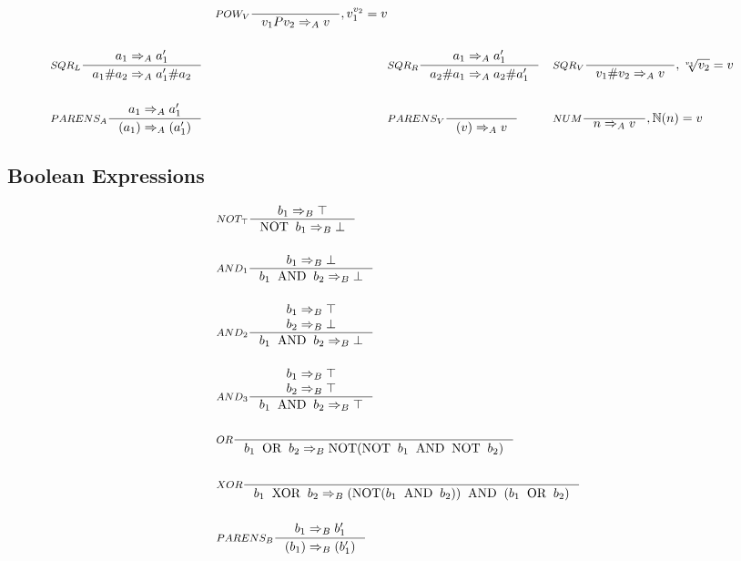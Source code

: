 \begin{align*}
&
&\inference[$POW_V$]{}
                    {v_1 P v_2 \Rightarrow_A v}
										{, v_1 ^ {v_2} = v}
\\\\
&\inference[$SQR_L$]{a_1  \Rightarrow_A a_1'}
                    {a_1 \# a_2 \Rightarrow_A a_1' \# a_2}
&
&\inference[$SQR_R$]{a_1 \Rightarrow_A a_1'}
                    {a_2 \# a_1 \Rightarrow_A a_2 \# a_1'}
&
&\inference[$SQR_V$]{}
                    {v_1 \# v_2 \Rightarrow_A v}
										{, \sqrt[v_1]{v_2} = v}
\\\\
&\inference[$PARENS_A$]{a_1 \Rightarrow_A a_1'}
                       {(a_1) \Rightarrow_A (a_1')}
&
&\inference[$PARENS_V$]{}
                       {(v) \Rightarrow_A v}
&
&\inference[$NUM$]{}
                  {n \Rightarrow_A v}
									{, \mathbb{N}(n) = v}
\end{align*}

\subsection{Boolean Expressions}
\begin{align*}
&\inference[$NOT_\top$]{b_1 \Rightarrow_B \top}
                       {\textrm{NOT} \;\; b_1 \Rightarrow_B \bot}
\\\\
&\inference[$AND_1$]{b_1 \Rightarrow_B \bot}
                    {b_1 \;\; \textrm{AND} \;\; b_2 \Rightarrow_B \bot}
\\\\
&\inference[$AND_2$]{b_1 \Rightarrow_B \top \\ b_2 \Rightarrow_B \bot}
								    {b_1 \;\; \textrm{AND} \;\; b_2 \Rightarrow_B \bot}
\\\\
&\inference[$AND_3$]{b_1 \Rightarrow_B \top \\ b_2 \Rightarrow_B \top}
								    {b_1 \;\; \textrm{AND} \;\; b_2 \Rightarrow_B \top}
\\\\
&\inference[$OR$]{}
                 {b_1 \;\; \textrm{OR} \;\; b_2 \Rightarrow_B \textrm{NOT}(\textrm{NOT} \;\; b_1 \;\; \textrm{AND} \;\; \textrm{NOT} \;\; b_2)}
\\\\
&\inference[$XOR$]{}
                  {b_1 \;\; \textrm{XOR} \;\; b_2 \Rightarrow_B (\textrm{NOT}(b_1 \;\; \textrm{AND} \;\; b_2)) \;\; \textrm{AND} \;\; (b_1 \;\; \textrm{OR} \;\; b_2)}
\\\\
&\inference[$PARENS_B$]{b_1 \Rightarrow_B b_1'}
                       {(b_1) \Rightarrow_B (b_1')}
\end{align*}

